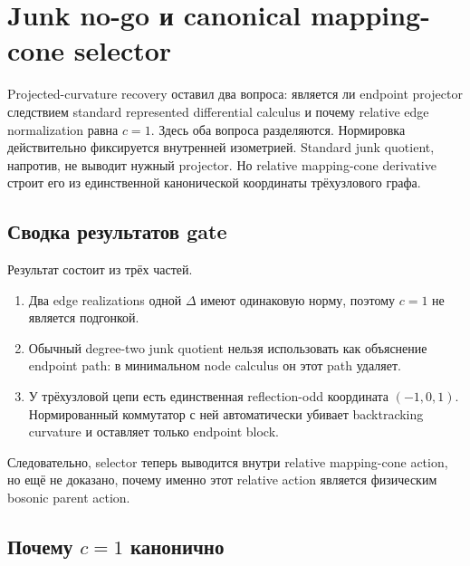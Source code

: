 \chapter{Junk no-go и canonical mapping-cone selector}

Projected-curvature recovery оставил два вопроса: является ли endpoint
projector следствием standard represented differential calculus и почему
relative edge normalization равна \(c=1\). Здесь оба вопроса разделяются.
Нормировка действительно фиксируется внутренней изометрией. Standard junk
quotient, напротив, не выводит нужный projector. Но relative mapping-cone
derivative строит его из единственной канонической координаты трёхузлового
графа.

\section{Сводка результатов gate}

Результат состоит из трёх частей.
\begin{enumerate}
 \item Два edge realizations одной \(\Delta\) имеют одинаковую норму, поэтому
 \(c=1\) не является подгонкой.
 \item Обычный degree-two junk quotient нельзя использовать как объяснение
 endpoint path: в минимальном node calculus он этот path удаляет.
 \item У трёхузловой цепи есть единственная reflection-odd координата
 \((-1,0,1)\). Нормированный коммутатор с ней автоматически убивает
 backtracking curvature и оставляет только endpoint block.
\end{enumerate}
Следовательно, selector теперь выводится внутри relative mapping-cone
action, но ещё не доказано, почему именно этот relative action является
физическим bosonic parent action.

\section{Почему \texorpdfstring{\(c=1\)}{c=1} канонично}


